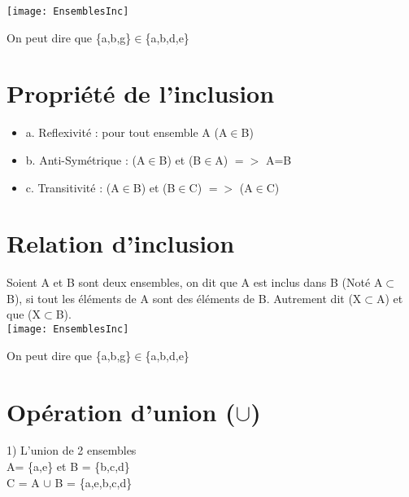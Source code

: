 \texttt{[image: EnsemblesInc]}
\vspace{3mm} %

On peut dire que \{a,b,g\}$\in$\{a,b,d,e\} \\


\section{Propriété de l'inclusion}
\vspace{3mm} %

\begin{itemize}
\item {a. Reflexivité : pour tout ensemble A (A$\in$B)}
\item {b. Anti-Symétrique : (A$\in$B) et (B$\in$A) $=>$ A=B}
\item {c. Transitivité : (A$\in$B) et (B$\in$C) $=>$ (A$\in$C)}
\end{itemize}

\newpage

\section{Relation d'inclusion}
\vspace{3mm} %

Soient A et B sont deux ensembles, on dit que A est inclus dans B (Noté A$\subset$ B), si tout les éléments de A sont des éléments de B. Autrement dit (X$\subset$A) et que (X$\subset$B).\\

\texttt{[image: EnsemblesInc]}
\vspace{3mm} %

On peut dire que \{a,b,g\}$\in$\{a,b,d,e\} \\

\vspace{3mm} %
\section{Opération d'union ($\cup$)}
\vspace{3mm} %

1) L'union de 2 ensembles \\
A= \{a,e\} et B = \{b,c,d\} \\

C = A $\cup$ B = \{a,e,b,c,d\}

\vspace{3mm} %
